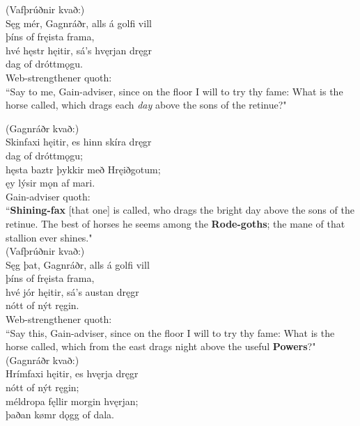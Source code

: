 (Vafþrúðnir kvað:) \\%
\bva Sęg mér, Gagnráðr, \hld alls á golfi vill \\%
þíns of fręista frama, \\%
hvé hęstr hęitir, \hld sá's hvęrjan dręgr \\%
dag of dróttmǫgu.\\%

\bvb Web-strengthener quoth: \\ “Say to me, Gain-adviser, since on the floor I will to try thy fame: What is the horse called, which drags each \emph{day} above the sons of the retinue\footnotemark[20]?" \\

(Gagnráðr kvað:) \\%
\bva Skinfaxi hęitir, \hld es hinn skíra dręgr \\%
dag of dróttmǫgu; \\%
hęsta baztr \hld þykkir með Hręiðgotum; \\%
ęy lýsir mǫn af mari.\\%

\bvb Gain-adviser quoth: \\ “\textbf{Shining-fax} [that one] is called, who drags the bright day above the sons of the retinue. The best of horses he seems among the \textbf{Rode-goths}; the mane of that stallion ever shines." \\

(Vafþrúðnir kvað:) \\%
\bva Sęg þat, Gagnráðr, \hld alls á golfi vill \\%
þíns of fręista frama, \\%
hvé jór hęitir, \hld sá's austan dręgr \\%
nótt of nýt ręgin.\\%

\bvb Web-strengthener quoth: \\ “Say this, Gain-adviser, since on the floor I will to try thy fame: What is the horse called, which from the east drags night above the useful \textbf{Powers}?" \\

(Gagnráðr kvað:) \\%
\bva Hrímfaxi hęitir, \hld es hvęrja dręgr \\%
nótt of nýt ręgin; \\%
méldropa fęllir \hld morgin hvęrjan; \\%
þaðan kømr dǫgg of dala.\\%

